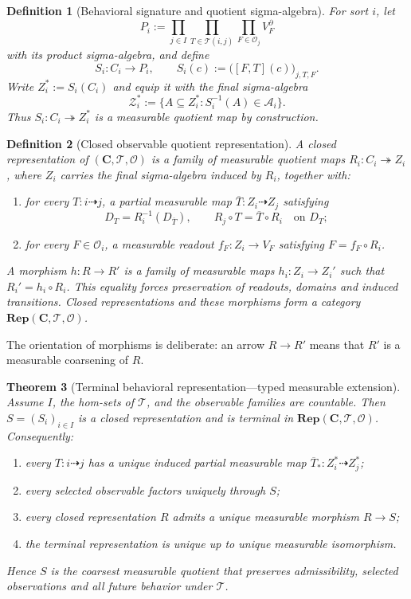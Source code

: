 \documentclass[11pt]{article}
\newtheorem{definition}{Definition}[section]
\newtheorem{theorem}[definition]{Theorem}
\begin{document}
{\begin{definition}[Behavioral signature and quotient sigma-algebra]\label{def:typed-signature}
For sort $i$, let
\[
 P_i:=\prod_{j\in I}\prod_{T\in\mathcal T(i,j)}
       \prod_{F\in\mathcal O_j}V_F^\partial
\]
with its product sigma-algebra, and define
\[
 S_i:C_i\longrightarrow P_i,
 \qquad S_i(c):=\bigl([F,T](c)\bigr)_{j,T,F}.
\]
Write $Z_i^*:=S_i(C_i)$ and equip it with the final sigma-algebra
\[
 \mathcal Z_i^*:=\{A\subseteq Z_i^*:S_i^{-1}(A)\in\mathcal A_i\}.
\]
Thus $S_i:C_i\twoheadrightarrow Z_i^*$ is a measurable quotient map by construction.
\end{definition}

\begin{definition}[Closed observable quotient representation]\label{def:closed-rep}
A closed representation of $(\mathbf C,\mathcal T,\mathcal O)$ is a family of measurable quotient maps $R_i:C_i\twoheadrightarrow Z_i$, where $Z_i$ carries the final sigma-algebra induced by $R_i$, together with:
\begin{enumerate}
\item for every $T:i\dashrightarrow j$, a partial measurable map $\overline T:Z_i\dashrightarrow Z_j$ satisfying
\[
D_T=R_i^{-1}(D_{\overline T}),\qquad
R_j\circ T=\overline T\circ R_i\quad\text{on }D_T;
\]
\item for every $F\in\mathcal O_i$, a measurable readout $f_F:Z_i\to V_F$ satisfying $F=f_F\circ R_i$.
\end{enumerate}
A morphism $h:R\to R'$ is a family of measurable maps $h_i:Z_i\to Z_i'$ such that $R_i'=h_i\circ R_i$. This equality forces preservation of readouts, domains and induced transitions. Closed representations and these morphisms form a category $\mathbf{Rep}(\mathbf C,\mathcal T,\mathcal O)$.
\end{definition}

The orientation of morphisms is deliberate: an arrow $R\to R'$ means that $R'$ is a measurable coarsening of $R$.

\begin{theorem}[Terminal behavioral representation---typed measurable extension]\label{thm:typed-minimal}
Assume $I$, the hom-sets of $\mathcal T$, and the observable families are countable. Then $S=(S_i)_{i\in I}$ is a closed representation and is terminal in $\mathbf{Rep}(\mathbf C,\mathcal T,\mathcal O)$. Consequently:
\begin{enumerate}
\item every $T:i\dashrightarrow j$ has a unique induced partial measurable map $\overline T_*:Z_i^*\dashrightarrow Z_j^*$;
\item every selected observable factors uniquely through $S$;
\item every closed representation $R$ admits a unique measurable morphism $R\to S$;
\item the terminal representation is unique up to unique measurable isomorphism.
\end{enumerate}
Hence $S$ is the coarsest measurable quotient that preserves admissibility, selected observations and all future behavior under $\mathcal T$.
\end{theorem}

}
\end{document}
